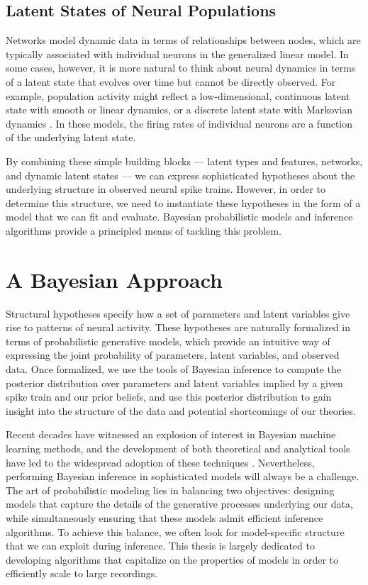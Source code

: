 \subsection{Latent States of Neural Populations}
Networks model dynamic data in terms of relationships between nodes,
which are typically associated with individual neurons in the
generalized linear model. In some cases, however, it is more natural
to think about neural dynamics in terms of a latent state that evolves
over time but cannot be directly observed. For example, population
activity might reflect a low-dimensional, continuous latent state with
smooth \citep{Yu09} or linear \citep{Smith-2003, paninski2010new}
dynamics, or a discrete latent state with Markovian dynamics
\citep[e.g.][]{jones2007natural, latimer2015single}.  In these models,
the firing rates of individual neurons are a function of the
underlying latent state.

By combining these simple building blocks --- latent types and features, 
networks, and dynamic latent states --- we can express sophisticated 
hypotheses about the underlying structure in observed neural spike trains. 
However, in order to determine this structure, we need to instantiate these 
hypotheses in the form of a model that we can fit and evaluate.
Bayesian probabilistic models and inference algorithms provide a principled 
means of tackling this problem.


\section{A Bayesian Approach} 
Structural hypotheses specify how a set of parameters and latent
variables give rise to patterns of neural activity.  These hypotheses
are naturally formalized in terms of probabilistic generative models,
which provide an intuitive way of expressing the joint probability of
parameters, latent variables, and observed data.  Once formalized, we
use the tools of Bayesian inference to compute the posterior
distribution over parameters and latent variables implied by a given
spike train and our prior beliefs, and use this posterior distribution
to gain insight into the structure of the data and potential
shortcomings of our theories.

Recent decades have witnessed an explosion of interest in Bayesian
machine learning methods, and the development of both theoretical and
analytical tools have led to the widespread adoption of these
techniques \citep{bishop2006pattern, murphy2012probabilistic}.
Nevertheless, performing Bayesian inference in sophisticated models
will always be a challenge. The art of probabilistic modeling lies in
balancing two objectives: designing models that capture the details of
the generative processes underlying our data, while simultaneously
ensuring that these models admit efficient inference algorithms. To
achieve this balance, we often look for model-specific structure that
we can exploit during inference.  This thesis is largely dedicated to
developing algorithms that capitalize on the properties of models in
order to efficiently scale to large recordings.


